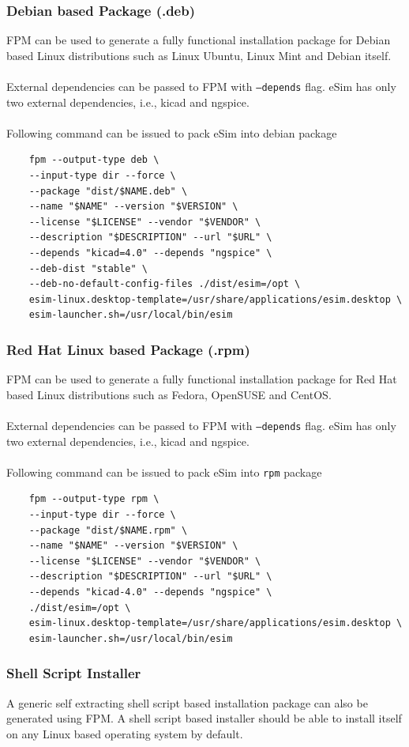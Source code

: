 \documentclass[12pt,a4paper]{report}
\begin{document}
\subsubsection*{Debian based Package (.deb)}
FPM can be used to generate a fully functional installation package for Debian based Linux distributions such as Linux Ubuntu, Linux Mint and Debian itself.\\
\\
External dependencies can be passed to FPM with \texttt{--depends} flag. eSim has only two external dependencies, i.e., kicad and ngspice.\\
\\
Following command can be issued to pack eSim into debian package
\begin{verbatim}
    fpm --output-type deb \
    --input-type dir --force \
    --package "dist/$NAME.deb" \
    --name "$NAME" --version "$VERSION" \
    --license "$LICENSE" --vendor "$VENDOR" \
    --description "$DESCRIPTION" --url "$URL" \
    --depends "kicad=4.0" --depends "ngspice" \
    --deb-dist "stable" \
    --deb-no-default-config-files ./dist/esim=/opt \
    esim-linux.desktop-template=/usr/share/applications/esim.desktop \
    esim-launcher.sh=/usr/local/bin/esim
\end{verbatim}
\subsubsection*{Red Hat Linux based Package (.rpm)}
FPM can be used to generate a fully functional installation package for Red Hat based Linux distributions such as Fedora, OpenSUSE and CentOS.\\
\\
External dependencies can be passed to FPM with \texttt{--depends} flag. eSim has only two external dependencies, i.e., kicad and ngspice.\\
\\
Following command can be issued to pack eSim into \texttt{rpm} package
\begin{verbatim}
    fpm --output-type rpm \
    --input-type dir --force \
    --package "dist/$NAME.rpm" \
    --name "$NAME" --version "$VERSION" \
    --license "$LICENSE" --vendor "$VENDOR" \
    --description "$DESCRIPTION" --url "$URL" \
    --depends "kicad-4.0" --depends "ngspice" \
    ./dist/esim=/opt \
    esim-linux.desktop-template=/usr/share/applications/esim.desktop \
    esim-launcher.sh=/usr/local/bin/esim
\end{verbatim}
\subsubsection*{Shell Script Installer}
A generic self extracting shell script based installation package can also be generated using FPM. A shell script based installer should be able to install itself on any Linux based operating system by default.
\end{document}
